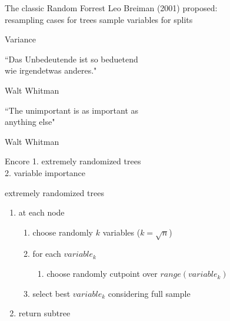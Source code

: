 \documentclass[12pt,t]{beamer}
\begin{document}
{\begin{frame}[c]{The classic Random Forrest}
    Leo Breiman (2001) proposed:\\
    resampling cases for trees \newline
    sample variables for splits
\end{frame}

\begin{frame}[c]{Variance}
  \begin{center}
  \large
  ``Das Unbedeutende ist so beduetend\\
  wie irgendetwas anderes."
  \end{center}
  \hfill {\textendash} Walt Whitman
  \textcolor{lolit}{
    \begin{center}
    \large
  ``The unimportant is as important as\\
  anything else"
    \end{center}
  \hfill {\textendash} Walt Whitman}
\end{frame}

\begin{frame}[c]{Encore}
  \Large
  1. extremely randomized trees\\
  2. variable importance\\
\end{frame}

\begin{frame}[c]{extremely randomized trees}
  \begin{enumerate}
    \item at each node
    \begin{enumerate}
       \item choose \textcolor<2>{hilit}{randomly} $k$ variables ($k = \sqrt{n}$)
       \item for each $variable_k$
       \begin{enumerate}
          \item choose \textcolor<2>{hilit}{randomly} cutpoint over $range(variable_k)$
        \end{enumerate}
        \item select best $variable_k$ \textcolor<3>{vhilit}{considering full sample}
    \end{enumerate}
    \item return subtree
 \end{enumerate}
\end{frame}

}
\end{document}
